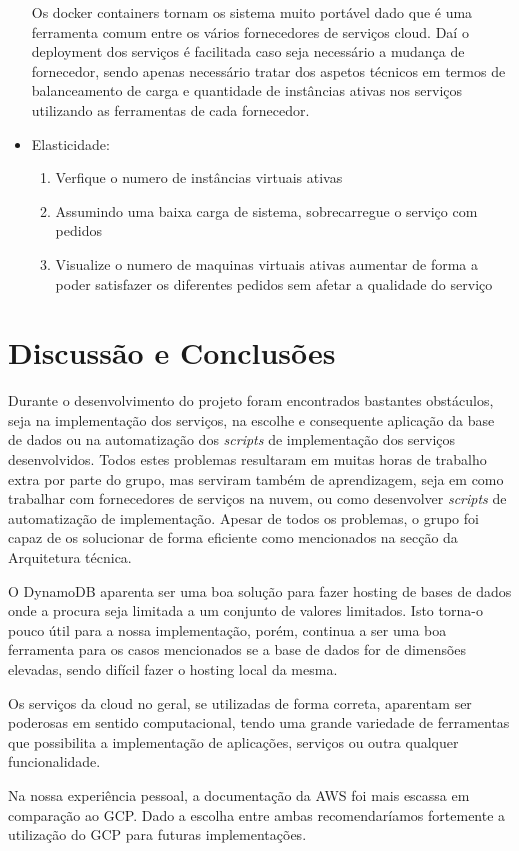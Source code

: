 \documentclass[11pt,a4paper]{article}
\begin{document}
\begin{itemize}
Os docker containers tornam os sistema muito portável dado que é uma ferramenta comum entre os vários fornecedores de serviços cloud. Daí o deployment dos serviços é facilitada caso seja necessário a mudança de fornecedor, sendo apenas necessário tratar dos aspetos técnicos em termos de balanceamento de carga e quantidade de instâncias ativas nos serviços utilizando as ferramentas de cada fornecedor.

	\item Elasticidade:
	\begin{enumerate}
		\item Verfique o numero de instâncias virtuais ativas
		\item Assumindo uma baixa carga de sistema, sobrecarregue o serviço com pedidos
		\item Visualize o numero de maquinas virtuais ativas aumentar de forma a poder satisfazer os diferentes pedidos sem afetar a qualidade do serviço
	\end{enumerate}
\end{itemize}

\section{Discussão e Conclusões}
Durante o desenvolvimento do projeto foram encontrados bastantes obstáculos, seja na implementação dos serviços, na escolhe e consequente aplicação da base de dados ou na automatização dos \textit{scripts} de implementação dos serviços desenvolvidos. Todos estes problemas resultaram em muitas horas de trabalho extra por parte do grupo, mas serviram também de aprendizagem, seja em como trabalhar com fornecedores de serviços na nuvem, ou como desenvolver \textit{scripts} de automatização de implementação. Apesar de todos os problemas, o grupo foi capaz de os solucionar de forma eficiente como mencionados na secção da Arquitetura técnica.

O DynamoDB aparenta ser uma boa solução para fazer hosting de bases de dados onde a procura seja limitada a um conjunto de valores limitados. Isto torna-o pouco útil para a nossa implementação, porém, continua a ser uma boa ferramenta para os casos mencionados se a base de dados for de dimensões elevadas, sendo difícil fazer o hosting local da mesma.

Os serviços da cloud no geral, se utilizadas de forma correta, aparentam ser poderosas em sentido computacional, tendo uma grande variedade de ferramentas que possibilita a implementação de aplicações, serviços ou outra qualquer funcionalidade.

Na nossa experiência pessoal, a documentação da AWS foi mais escassa em comparação ao GCP. Dado a escolha entre ambas recomendaríamos fortemente a utilização do GCP para futuras implementações.
\end{document}
